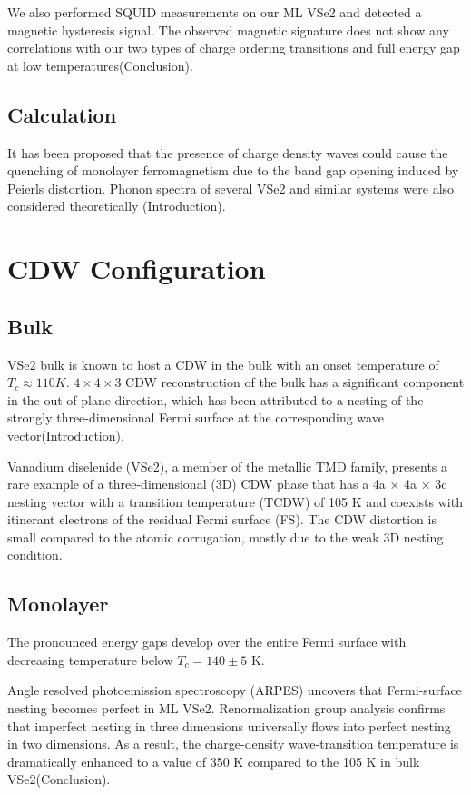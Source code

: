 We also performed SQUID measurements on our ML VSe2 and detected a magnetic hysteresis signal. The observed magnetic signature does not show any correlations with our two types of charge ordering transitions and full energy gap at low temperatures\cite{doi:10.1021/acs.nanolett.8b01764}(Conclusion).

\subsection{Calculation}
It has been proposed that the presence of charge density waves could cause the quenching of monolayer ferromagnetism due to the band gap opening induced by Peierls distortion. Phonon spectra of several VSe2 and similar systems were also considered theoretically \cite{C9CP03726H}(Introduction).
\section{CDW Configuration}
\subsection{Bulk}
VSe2 bulk is known to host a CDW in the bulk with an onset temperature of $T_c \approx 110 K$. $4 \times 4 \times 3$ CDW reconstruction of the bulk has a significant component in the
out-of-plane direction, which has been attributed to a nesting of the strongly three-dimensional Fermi surface at the corresponding wave vector\cite{doi:10.1021/acs.nanolett.8b01649}(Introduction).

Vanadium diselenide (VSe2), a member of the metallic TMD family, presents a rare example of a three-dimensional (3D) CDW phase that has a 4a × 4a × 3c nesting vector with a
transition temperature (TCDW) of 105 K and coexists with itinerant electrons of the residual Fermi surface (FS). The CDW distortion is small compared to the atomic corrugation,
mostly due to the weak 3D nesting condition\cite{doi:10.1021/acs.nanolett.8b01764}.

\subsection{Monolayer}
The pronounced energy gaps develop over the entire Fermi surface with decreasing temperature below $T_c = 140 \pm 5$ K\cite{doi:10.1021/acs.nanolett.8b01649}.

Angle resolved photoemission spectroscopy (ARPES) uncovers that Fermi-surface nesting becomes perfect in ML VSe2. Renormalization group analysis confirms that imperfect nesting in three dimensions universally flows into perfect nesting in two dimensions. As a result, the charge-density wave-transition temperature is dramatically enhanced to a value of 350 K compared to the 105 K in bulk VSe2\cite{doi:10.1021/acs.nanolett.8b01764}(Conclusion).

